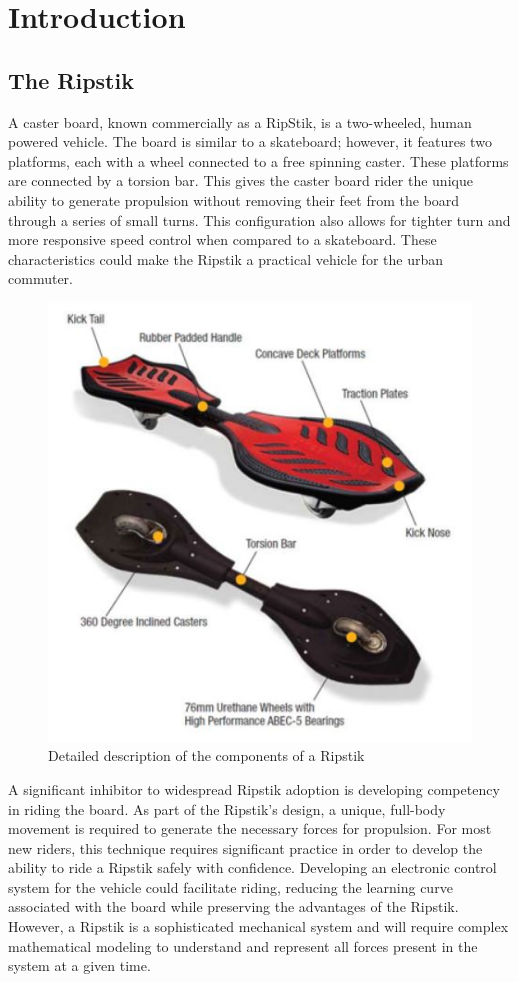 \section{Introduction}
\subsection{The Ripstik}
A caster board, known commercially as a RipStik, is a two-wheeled, human powered vehicle.
The board is similar to a skateboard; however, it features two platforms, each with a wheel connected to a free spinning caster.
These platforms are connected by a torsion bar. 
This gives the caster board rider the unique ability to generate propulsion without removing their feet from the board through a series of small turns. 
This configuration also allows for tighter turn and more responsive speed control when compared to a skateboard. 
These characteristics could make the Ripstik a practical vehicle for the urban commuter.
\begin{figure}[!htb]
\centering
{}
\includegraphics[width=\linewidth]{Ripstik.JPG}
\caption{Detailed description of the components of a Ripstik \cite{PIC}}\label{fig:Ripstik}
\endminipage
\end{figure}
\par
A significant inhibitor to widespread Ripstik adoption is developing competency in riding the board. 
As part of the Ripstik’s design, a unique, full-body movement is required to generate the necessary forces for propulsion. 
For most new riders, this technique requires significant practice in order to develop the ability to ride a Ripstik safely with confidence. 
Developing an electronic control system for the vehicle could facilitate riding, reducing the learning curve associated with the board while preserving the advantages of the Ripstik. 
However, a Ripstik is a sophisticated mechanical system and will require complex mathematical modeling to understand and represent all forces present in the system at a given time.

